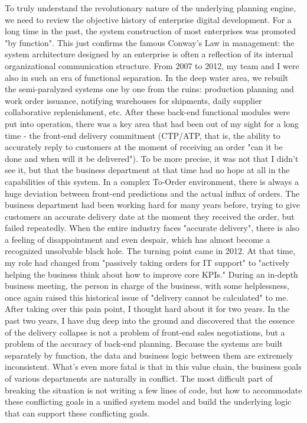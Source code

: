 \documentclass[11pt,a4paper]{article}
\begin{document}
To truly understand the revolutionary nature of the underlying planning engine, we need to review the objective history of enterprise digital development. For a long time in the past, the system construction of most enterprises was promoted "by function". This just confirms the famous Conway's Law in management: the system architecture designed by an enterprise is often a reflection of its internal organizational communication structure. From 2007 to 2012, my team and I were also in such an era of functional separation. In the deep water area, we rebuilt the semi-paralyzed systems one by one from the ruins: production planning and work order issuance, notifying warehouses for shipments, daily supplier collaborative replenishment, etc. After these back-end functional modules were put into operation, there was a key area that had been out of my sight for a long time - the front-end delivery commitment (CTP/ATP, that is, the ability to accurately reply to customers at the moment of receiving an order "can it be done and when will it be delivered"). To be more precise, it was not that I didn't see it, but that the business department at that time had no hope at all in the capabilities of this system. In a complex To-Order environment, there is always a huge deviation between front-end predictions and the actual influx of orders. The business department had been working hard for many years before, trying to give customers an accurate delivery date at the moment they received the order, but failed repeatedly. When the entire industry faces "accurate delivery", there is also a feeling of disappointment and even despair, which has almost become a recognized unsolvable black hole. The turning point came in 2012. At that time, my role had changed from "passively taking orders for IT support" to "actively helping the business think about how to improve core KPIs." During an in-depth business meeting, the person in charge of the business, with some helplessness, once again raised this historical issue of "delivery cannot be calculated" to me. After taking over this pain point, I thought hard about it for two years. In the past two years, I have dug deep into the ground and discovered that the essence of the delivery collapse is not a problem of front-end sales negotiations, but a problem of the accuracy of back-end planning. Because the systems are built separately by function, the data and business logic between them are extremely inconsistent. What's even more fatal is that in this value chain, the business goals of various departments are naturally in conflict. The most difficult part of breaking the situation is not writing a few lines of code, but how to accommodate these conflicting goals in a unified system model and build the underlying logic that can support these conflicting goals.
\end{document}
